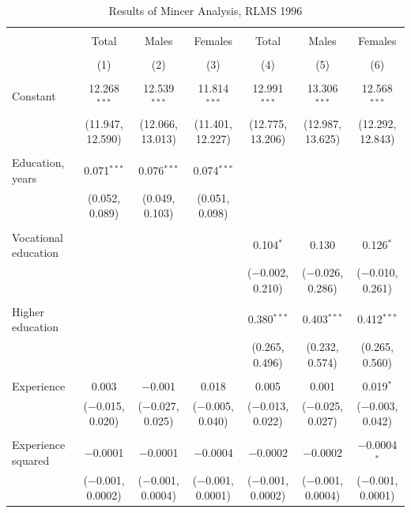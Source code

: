 \documentclass[alpha-refs]{wiley-article-01g}
\begin{document}
\begin{landscape}

\fontsize{9}{11}
\selectfont

\begin{table}[!htbp] \centering 
\renewcommand{\arraystretch}{1.0}
  \caption{Results of Mincer Analysis, RLMS 1996} 
  \label{} 
\begin{tabular}{@{\extracolsep{5pt}}lcccccc} 
\\[-.8ex]\hline 
\hline \\[-.8ex] 
 & Total & Males & Females & Total & Males & Females \\ 
\\[-.8ex] & (1) & (2) & (3) & (4) & (5) & (6)\\ 
\hline \\[-.8ex] 
 Constant & 12.268$^{***}$ & 12.539$^{***}$ & 11.814$^{***}$ & 12.991$^{***}$ & 13.306$^{***}$ & 12.568$^{***}$ \\ 
  & (11.947, 12.590) & (12.066, 13.013) & (11.401, 12.227) & (12.775, 13.206) & (12.987, 13.625) & (12.292, 12.843) \\ 
  & & & & & & \\ 
 Education, years & 0.071$^{***}$ & 0.076$^{***}$ & 0.074$^{***}$ &  &  &  \\ 
  & (0.052, 0.089) & (0.049, 0.103) & (0.051, 0.098) &  &  &  \\ 
  & & & & & & \\ 
 Vocational education &  &  &  & 0.104$^{*}$ & 0.130 & 0.126$^{*}$ \\ 
  &  &  &  & ($-$0.002, 0.210) & ($-$0.026, 0.286) & ($-$0.010, 0.261) \\ 
  & & & & & & \\ 
 Higher education &  &  &  & 0.380$^{***}$ & 0.403$^{***}$ & 0.412$^{***}$ \\ 
  &  &  &  & (0.265, 0.496) & (0.232, 0.574) & (0.265, 0.560) \\ 
  & & & & & & \\ 
 Experience & 0.003 & $-$0.001 & 0.018 & 0.005 & 0.001 & 0.019$^{*}$ \\ 
  & ($-$0.015, 0.020) & ($-$0.027, 0.025) & ($-$0.005, 0.040) & ($-$0.013, 0.022) & ($-$0.025, 0.027) & ($-$0.003, 0.042) \\ 
  & & & & & & \\ 
 Experience squared & $-$0.0001 & $-$0.0001 & $-$0.0004 & $-$0.0002 & $-$0.0002 & $-$0.0004$^{*}$ \\ 
  & ($-$0.001, 0.0002) & ($-$0.001, 0.0004) & ($-$0.001, 0.0001) & ($-$0.001, 0.0002) & ($-$0.001, 0.0004) & ($-$0.001, 0.0001) \\ 

\end{tabular}
\end{table}
\end{landscape}
\end{document}
